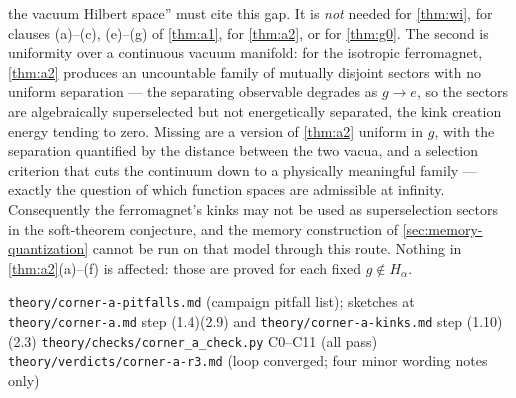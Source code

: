 \begin{scope}
the vacuum Hilbert space'' must cite this gap.  It is \emph{not} needed for
\cref{thm:wi}, for clauses (a)--(c), (e)--(g) of \cref{thm:a1}, for
\cref{thm:a2}, or for \cref{thm:g0}.  The second is uniformity over a continuous
vacuum manifold: for the isotropic ferromagnet, \cref{thm:a2} produces an
uncountable family of mutually disjoint sectors with no uniform separation --- the
separating observable degrades as $g\to e$, so the sectors are algebraically
superselected but not energetically separated, the kink creation energy tending to
zero.  Missing are a version of \cref{thm:a2} uniform in $g$, with the separation
quantified by the distance between the two vacua, and a selection criterion that
cuts the continuum down to a physically meaningful family --- exactly the question
of which function spaces are admissible at infinity.  Consequently the
ferromagnet's kinks may not be used as superselection sectors in the soft-theorem
conjecture, and the memory construction of \cref{sec:memory-quantization} cannot
be run on that model through this route.  Nothing in \cref{thm:a2}(a)--(f) is
affected: those are proved for each fixed $g\notin H_\alpha$.
\end{scope}

%
{\texttt{theory/corner-a-pitfalls.md} (campaign pitfall list); sketches at \texttt{theory/corner-a.md} step (1.4)(2.9) and \texttt{theory/corner-a-kinks.md} step (1.10)(2.3)}%
{\texttt{theory/checks/corner\_a\_check.py} C0--C11 (all pass)}%
{\texttt{theory/verdicts/corner-a-r3.md} (loop converged; four minor wording notes only)}
